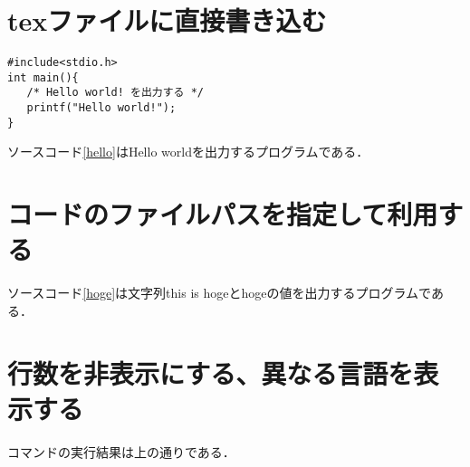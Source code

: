 \documentclass[a4j]{jarticle}
\begin{document}
\section{texファイルに直接書き込む}
\begin{lstlisting}[caption=helloworld.c, label=hello]
#include<stdio.h>
int main(){
   /* Hello world! を出力する */
   printf("Hello world!");
}
\end{lstlisting}
ソースコード\ref{hello}はHello worldを出力するプログラムである．

\section{コードのファイルパスを指定して利用する}

ソースコード\ref{hoge}は文字列this is hogeとhogeの値を出力するプログラムである．

\section{行数を非表示にする、異なる言語を表示する}

コマンドの実行結果は上の通りである．
\end{document}
